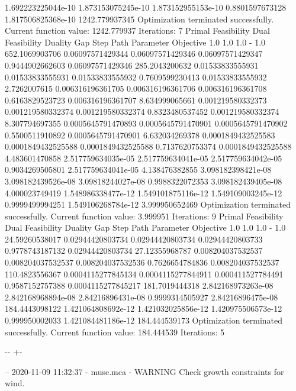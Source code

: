 \documentclass[letterpaper,10pt,english]{sphinxmanual}
\newlength\nbsphinxcodecellspacing
\begin{document}
{\begin{sphinxVerbatim}[commandchars=\\\{\}]
1.692223225044e-10  1.873153075245e-10  1.873152955153e-10  0.8801597673128  1.817506825368e-10  1242.779937345
Optimization terminated successfully.
         Current function value: 1242.779937
         Iterations: 7
Primal Feasibility  Dual Feasibility    Duality Gap         Step             Path Parameter      Objective
1.0                 1.0                 1.0                 -                1.0                 652.1069903706
0.06097571429344    0.06097571429346    0.06097571429347    0.9444902662603  0.06097571429346    285.2043200632
0.01533833555931    0.01533833555931    0.01533833555932    0.7609599230413  0.01533833555932    2.7262007615
0.006316196361705   0.006316196361706   0.006316196361708   0.6163829523723  0.006316196361707   8.634999065661
0.001219580332373   0.001219580332374   0.001219580332374   0.8323480537452  0.001219580332374   8.307794697355
0.0005645791470893  0.0005645791470901  0.0005645791470902  0.5500511910892  0.0005645791470901  6.632034269378
0.0001849432525583  0.0001849432525588  0.0001849432525588  0.7137620753374  0.0001849432525588  4.483601470858
2.517759634035e-05  2.517759634041e-05  2.517759634042e-05  0.9034269505801  2.517759634041e-05  4.138476382855
3.098182398421e-08  3.098182439526e-08  3.09818244027e-08   0.9988322072353  3.098182439405e-08  4.000023749419
1.548986338477e-12  1.549101875116e-12  1.549109003245e-12  0.9999499994251  1.549106268784e-12  3.999950652469
Optimization terminated successfully.
         Current function value: 3.999951
         Iterations: 9
Primal Feasibility  Dual Feasibility    Duality Gap         Step             Path Parameter      Objective
1.0                 1.0                 1.0                 -                1.0                 24.59260538017
0.02944420803734    0.02944420803734    0.02944420803733    0.9778743187132  0.02944420803734    27.12355968787
0.008204037532537   0.008204037532537   0.008204037532536   0.7626654784836  0.008204037532537   110.4823556367
0.0004115277845134  0.0004115277844911  0.000411527784491   0.9587152757388  0.0004115277845217  181.7019444318
2.842168973263e-08  2.842168968894e-08  2.84216896431e-08   0.9999314505927  2.84216896475e-08   184.4443098122
1.421064808692e-12  1.421032025856e-12  1.420975506573e-12  0.999950002033   1.421084481186e-12  184.444539173
Optimization terminated successfully.
         Current function value: 184.444539
         Iterations: 5
\end{sphinxVerbatim}
}

{

\kern-\sphinxverbatimsmallskipamount\kern-\baselineskip
\kern+\FrameHeightAdjust\kern-\fboxrule
\vspace{\nbsphinxcodecellspacing}

\begin{sphinxVerbatim}[commandchars=\\\{\}]
-- 2020-11-09 11:32:37 - muse.mca - WARNING
Check growth constraints for wind.

\end{sphinxVerbatim}
}
\end{document}
